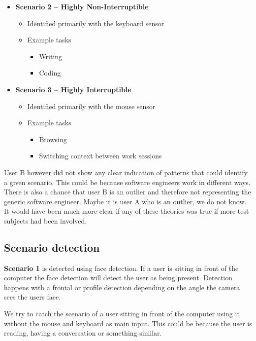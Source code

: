 \documentclass{sigchi}
\begin{document}
\begin{itemize}
  \item \textbf{Scenario 2 – Highly Non-Interruptible}
  \begin{itemize}
    \item Identified primarily with the keyboard sensor
    \item Example tasks
    \begin{itemize}
      \item Writing
      \item Coding
    \end{itemize}
  \end{itemize}
\end{itemize}

\begin{itemize}
  \item \textbf{Scenario 3 – Highly Interruptible}
  \begin{itemize}
    \item Identified primarily with the mouse sensor
    \item Example tasks
    \begin{itemize}
      \item Browsing
      \item Switching context between work sessions
    \end{itemize}
  \end{itemize}
\end{itemize}

User B however did not show any clear indication of patterns that could identify a given scenario.
This could be because software engineers work in different ways.
There is also a chance that user B is an outlier and therefore not representing the generic software engineer.
Maybe it is user A who is an outlier, we do not know.
It would have been much more clear if any of these theories was true if more test subjects had been involved.

\subsection{Scenario detection}
\textbf{Scenario 1} is detected using face detection.
If a user is sitting in front of the computer the face detection will detect the user as being present.
Detection happens with a frontal or profile detection depending on the angle the camera sees the users face.

We try to catch the scenario of a user sitting in front of the computer using it without the mouse and keyboard as main input.
This could be because the user is reading, having a conversation or something similar.
\end{document}
